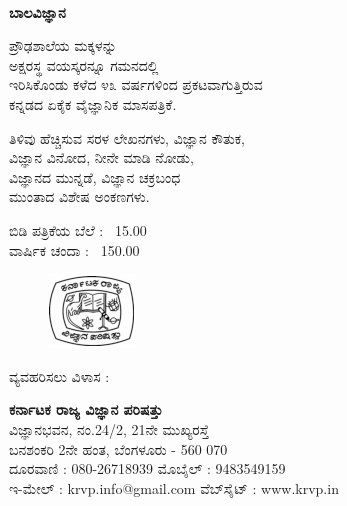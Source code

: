 
~
\thispagestyle{empty}

\begin{center}
{\LARGE\textbf{{ಬಾಲವಿಜ್ಞಾನ}}}

\vfill

ಪ್ರೌಢಶಾಲೆಯ ಮಕ್ಕಳನ್ನು\\
ಅಕ್ಷರಸ್ಥ ವಯಸ್ಕರನ್ನೂ ಗಮನದಲ್ಲಿ\\
ಇರಿಸಿಕೊಂಡು ಕಳೆದ ೪೩ ವರ್ಷಗಳಿಂದ ಪ್ರಕಟವಾಗುತ್ತಿರುವ\\
ಕನ್ನಡದ ಏಕೈಕ ವೈಜ್ಞಾನಿಕ ಮಾಸಪತ್ರಿಕೆ.

\vfill

ತಿಳಿವು ಹೆಚ್ಚಿಸುವ ಸರಳ ಲೇಖನಗಳು, ವಿಜ್ಞಾನ ಕೌತುಕ,\\
ವಿಜ್ಞಾನ ವಿನೋದ, ನೀನೇ ಮಾಡಿ ನೋಡು,\\
ವಿಜ್ಞಾನದ ಮುನ್ನಡೆ, ವಿಜ್ಞಾನ ಚಕ್ರಬಂಧ\\
ಮುಂತಾದ ವಿಶೇಷ ಅಂಕಣಗಳು.\\

\vfill

ಬಿಡಿ ಪತ್ರಿಕೆಯ ಬೆಲೆ : \rupee\ 15.00\\
ವಾರ್ಷಿಕ ಚಂದಾ : \rupee\ 150.00

\vfill

\begin{figure}[H]
\centering
\includegraphics[scale=.7]{src/figure/logo.jpg}
\end{figure}

\vfill
ವ್ಯವಹರಿಸಲು ವಿಳಾಸ :

\vfill

\textbf{ಕರ್ನಾಟಕ ರಾಜ್ಯ ವಿಜ್ಞಾನ ಪರಿಷತ್ತು}\\
ವಿಜ್ಞಾನಭವನ, ನಂ.24/2, 21ನೇ ಮುಖ್ಯರಸ್ತೆ\\
ಬನಶಂಕರಿ 2ನೇ ಹಂತ, ಬೆಂಗಳೂರು - 560 070\\
ದೂರವಾಣಿ : 080-26718939   ಮೊಬೈಲ್​ : 9483549159\\
ಇ-ಮೇಲ್​ : krvp.info@gmail.com   ವೆಬ್​ಸೈಟ್​ : www.krvp.in
\end{center}
